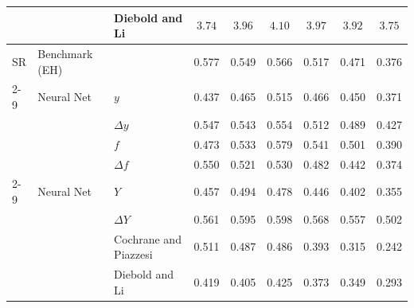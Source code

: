 \begin{tabular}{lllcccccc}
 &  & Diebold and Li & $3.74$ & $3.96$ & $4.10$ & $3.97$ & $3.92$ & $3.75$ \\
    \hline
SR & Benchmark (EH) &  & 0.577 & 0.549 & 0.566 & 0.517 & 0.471 & 0.376 \\
    \cline{2-9}
 & Neural Net & $y$ & 0.437 & 0.465 & 0.515 & 0.466 & 0.450 & 0.371 \\
 &  & $\Delta y$ & 0.547 & 0.543 & 0.554 & 0.512 & 0.489 & 0.427 \\
 &  & $f$ & 0.473 & 0.533 & 0.579 & 0.541 & 0.501 & 0.390 \\
 &  & $\Delta f$ & 0.550 & 0.521 & 0.530 & 0.482 & 0.442 & 0.374 \\
    \cline{2-9}
 & Neural Net & $Y$ & 0.457 & 0.494 & 0.478 & 0.446 & 0.402 & 0.355 \\
 &  & $\Delta Y$ & 0.561 & 0.595 & 0.598 & 0.568 & 0.557 & 0.502 \\
 &  & Cochrane and Piazzesi & 0.511 & 0.487 & 0.486 & 0.393 & 0.315 & 0.242 \\
 &  & Diebold and Li & 0.419 & 0.405 & 0.425 & 0.373 & 0.349 & 0.293 \\
    \hline
    \end{tabular}
